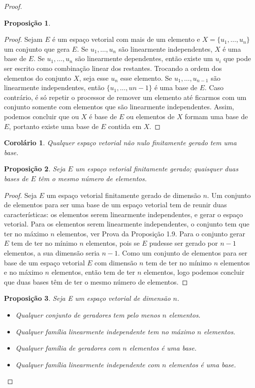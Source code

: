 \documentclass{article}
\newtheorem{corollary}{Corolário}[section]
\newtheorem{proposition}{Proposição}[section]
\begin{document}
\begin{proof}
\begin{proposition}
	\end{proposition}
	\begin{proof}
		Sejam $E$ é um espaço vetorial com mais de um elemento e $X=\{u_1,\dots,u_n\}$ um conjunto que gera $E$. Se $u_1,\dots,u_n$ são linearmente independentes, $X$ é uma base de $E$. Se $u_1,\dots,u_n$ são linearmente dependentes, então existe um $u_i$ que pode ser escrito como combinação linear dos restantes. Trocando a ordem dos elementos do conjunto $X$, seja esse  $u_n$ esse elemento. Se $u_1,\dots,u_{n-1}$ são linearmente independentes, então $\{u_1,\dots,u{n-1}\}$ é uma base de $E$. Caso contrário, é só repetir o processor de remover um elemento até ficarmos com um conjunto somente com elementos que são linearmente independentes. Assim, podemos concluir que ou $X$ é base de  $E$ ou elementos de $X$ formam uma base de $E$, portanto existe uma base de $E$ contida em $X$.
	\end{proof}
	\begin{corollary}

		Qualquer espaço vetorial não nulo finitamente gerado tem uma base.

	\end{corollary}

	\begin{proposition}
    		Seja $E$ um espaço vetorial finitamente gerado; quaisquer duas bases de 
$E$ têm o mesmo número de elementos.

	\end{proposition}

	\begin{proof}
    		Seja $E$ um espaço vetorial finitamente gerado de dimensão $n$. Um conjunto de elementos para ser uma base de um espaço vetorial tem de reunir duas características: os elementos serem linearmente independentes, e gerar o espaço vetorial. Para os elementos serem linearmente independentes, o conjunto tem que ter no máximo $n$ elementos, ver Prova da Proposição 1.9. Para o conjunto gerar $E$ tem de ter no mínimo $n$ elementos, pois se $E$ pudesse ser gerado por $n-1$ elementos, a sua dimensão seria $n-1$. Como um conjunto de elementos para ser base de um espaço vetorial $E$ com dimensão $n$ tem de ter no mínimo $n$ elementos e no máximo $n$ elementos, então tem de ter $n$ elementos, logo podemos concluir que duas bases têm de ter o mesmo número de elementos.
	\end{proof}
	
	\begin{proposition}
    		Seja E um espaço vetorial de dimensão $n$.
		\begin{itemize}
    		\item Qualquer conjunto de geradores tem pelo menos $n$ elementos.
    		\item Qualquer família linearmente independente tem no máximo $n$ elementos.
    		\item Qualquer família de geradores com $n$ elementos é uma base.
    		\item Qualquer família linearmente independente com $n$ elementos é uma base.


\end{itemize}
\end{proposition}
\end{proof}
\end{document}
